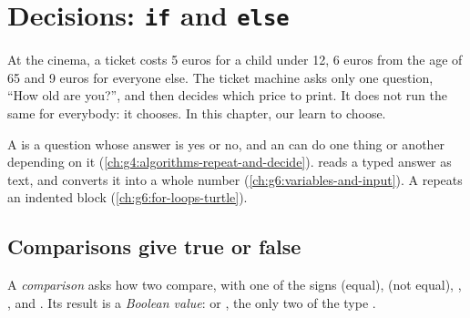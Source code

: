 \chapter{Decisions: \texttt{if} and \texttt{else}}\label{ch:g6:if-else}

At the cinema, a ticket costs 5 euros for a child under 12, 6 euros from the
age of 65 and 9 euros for everyone else. The ticket machine asks only one
question, ``How old are you?'', and then decides which price to print. It does
not run the same  for everybody: it chooses. In this chapter,
our  learn to choose.

\begin{recall}
A  is a question whose answer is yes or no, and an  can do
one thing or another depending on it (\cref{ch:g4:algorithms-repeat-and-decide}).
 reads a typed answer as text, and  converts it into a
whole number (\cref{ch:g6:variables-and-input}). A   repeats an
indented block (\cref{ch:g6:for-loops-turtle}).
\end{recall}

\section{Comparisons give true or false}

\begin{definition}\label{def:g6:if-else:comparison}
A \emph{comparison} asks how two  compare, with one
of the signs \code{==} (equal), \code{!=} (not equal), \code{<}, \code{<=},
\code{>} and \code{>=}. Its result is a \emph{Boolean value}:  or , the only two  of the type
.
\end{definition}

\label{lst:g6:if-else:compare}

\label{out:g6:if-else:compare}

